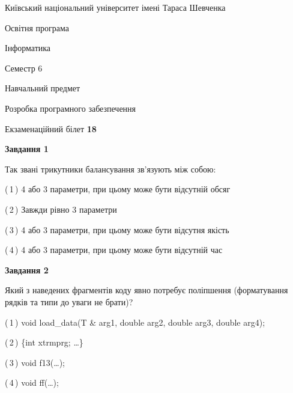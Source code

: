 \documentclass[10pt, ukrainian]{article}
\begin{document}
{{\begin {small}\par
{ \center  Київський національний університет імені Тараса Шевченка \par}
{\parbox {5 cm}{Освітня програма \hfill}{\parbox {7 cm}{Інформатика \hfill}}\parbox {6 cm}{\hfill Семестр 6}}\par
{\parbox {5 cm} {Навчальний предмет \hfill}\parbox {7 cm}{Розробка програмного забезпечення \hfill}\parbox {6cm}{\hfill}\par}\vspace{-7pt} \end{small}}{\center Екзаменаційний білет \No \textbf
{ 18 }\par}}
{
\begin {large}
{\begin {center}\textbf{Завдання 1}\end {center}}\par
Так звані трикутники балансування зв'язують між собою:\par
\vspace{2mm}



(\,1\,) 4 або 3 параметри, при цьому може бути відсутній обсяг %



(\,2\,) Завжди рівно 3 параметри%



(\,3\,) 4 або 3 параметри, при цьому може бути відсутня якість%



(\,4\,) 4 або 3 параметри, при цьому може бути відсутній час%


{\begin {center}\textbf{Завдання 2}\end {center}}\par
Який з наведених фрагментів коду явно потребує поліпшення (форматування рядків та типи до уваги не брати)?\par
\vspace{2mm}



(\,1\,) void load\_data(T \& arg1, double arg2, double arg3, double arg4); %



(\,2\,) \{int xtrmprg; …\}%



(\,3\,) void f13(…);%



(\,4\,) void ff(…);%



\end{large}}
\end{document}

